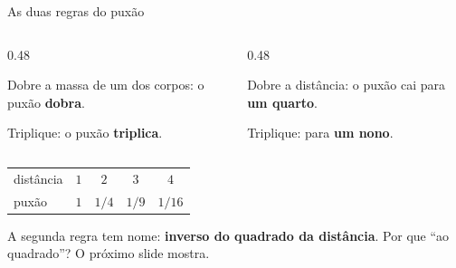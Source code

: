 \documentclass[aspectratio=169,11pt]{beamer}
\newcommand{\bnum}[1]{\textbf{\textcolor{mTeal}{#1}}}
\begin{document}
\begin{frame}{As duas regras do puxão}
  \begin{columns}[T]
    \begin{column}{0.48\textwidth}
      \begin{regra}[title={Regra 1 · Mais massa, mais puxão}]
        Dobre a massa de um dos corpos: o puxão \bnum{dobra}.
        \medskip

        Triplique: o puxão \bnum{triplica}.
      \end{regra}
    \end{column}
    \begin{column}{0.48\textwidth}
      \begin{regra}[title={Regra 2 · Mais longe, muito menos puxão}]
        Dobre a distância: o puxão cai para \bnum{um quarto}.
        \medskip

        Triplique: para \bnum{um nono}.
      \end{regra}
    \end{column}
  \end{columns}
  \bigskip
  \centering
  \small
  \renewcommand{\arraystretch}{1.3}
  \begin{tabular}{lcccc}
    \toprule
    distância & $1$ & $2$ & $3$ & $4$ \\
    puxão & $1$ & $1/4$ & $1/9$ & $1/16$ \\
    \bottomrule
  \end{tabular}
  \medskip

  A segunda regra tem nome: \bnum{inverso do quadrado da distância}. Por que ``ao
  quadrado''? O próximo slide mostra.
\end{frame}
\end{document}
